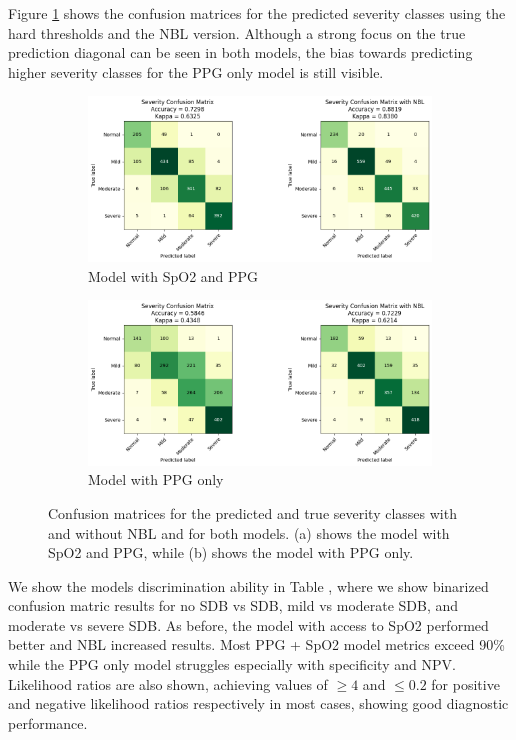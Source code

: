 Figure \ref{fig:severity-class-level-confusion-matrices} shows the confusion matrices for the predicted severity classes using the hard thresholds and the NBL version. Although a strong focus on the true prediction diagonal can be seen in both models, the bias towards predicting higher severity classes for the PPG only model is still visible.

\begin{figure}
      \begin{subfigure}{\textwidth}
          \includegraphics[width=\textwidth]{images/SevClassConfMatrix}
          \caption{Model with SpO2 and PPG}
      \end{subfigure}
      \begin{subfigure}{\textwidth}
          \includegraphics[width=\textwidth]{images/SevClassConfMatrixNoSpO2}
          \caption{Model with PPG only}
      \end{subfigure}
    \caption{Confusion matrices for the predicted and true severity classes with and without NBL and for both models. (a) shows the model with SpO2 and PPG, while (b) shows the model with PPG only.}
    \label{fig:severity-class-level-confusion-matrices}
\end{figure}

We show the models discrimination ability in Table , where we show binarized confusion matric results for no SDB vs SDB, mild vs moderate SDB, and moderate vs severe SDB. As before, the model with access to SpO2 performed better and NBL increased results. Most PPG + SpO2 model metrics exceed 90\% while the PPG only model struggles especially with specificity and NPV. Likelihood ratios are also shown, achieving values of $\geq 4$ and $\leq 0.2$ for positive and negative likelihood ratios respectively in most cases, showing good diagnostic performance.

